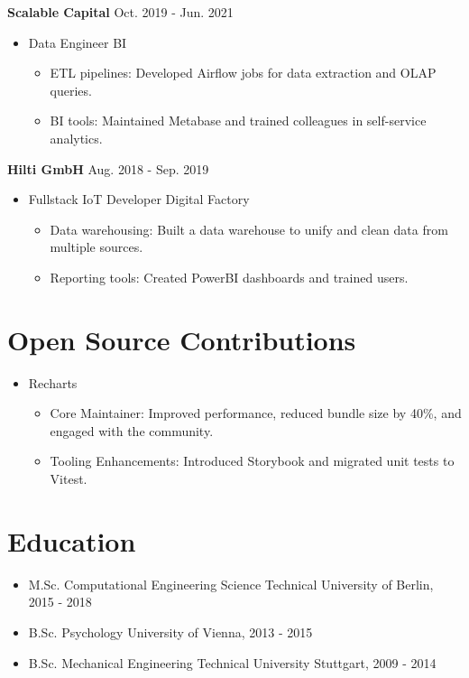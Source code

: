 \documentclass[letterpaper,11pt]{article}
\newcommand{\roleSpacing}{\vspace{4pt}}
\newcommand{\role}[2]{\item{#1 \hfill #2 \\}} %
\newcommand{\station}[2]{\textbf{#1}  \hfill #2 \\} %
\newcommand{\project}[2]{\item\small{#1: #2}} %
\newcommand{\resumeSubHeadingListStart}{\begin{itemize}[leftmargin=*]}
\newcommand{\resumeSubHeadingListEnd}{\end{itemize}}
\newcommand{\projectliststart}{\begin{itemize}[leftmargin=*] \vspace{-5pt} }
\newcommand{\projectlistend}{\end{itemize}\vspace{-5pt}}
\begin{document}
\roleSpacing

\station{Scalable Capital}{Oct. 2019 - Jun. 2021}
\resumeSubHeadingListStart
\role{Data Engineer}{BI}
\projectliststart
\project{ETL pipelines}{Developed Airflow jobs for data extraction and OLAP queries.}
\project{BI tools}{Maintained Metabase and trained colleagues in self-service analytics.}
\projectlistend
\resumeSubHeadingListEnd

\roleSpacing

\station{Hilti GmbH}{Aug. 2018 - Sep. 2019}
\resumeSubHeadingListStart
\role{Fullstack IoT Developer}{Digital Factory}
\projectliststart
\project{Data warehousing}{Built a data warehouse to unify and clean data from multiple sources.}
\project{Reporting tools}{Created PowerBI dashboards and trained users.}
\projectlistend
\resumeSubHeadingListEnd

\section{Open Source Contributions}

\resumeSubHeadingListStart
\role{Recharts}{}
\projectliststart
\project{Core Maintainer}{Improved performance, reduced bundle size by 40\%, and engaged with the community.}
\project{Tooling Enhancements}{Introduced Storybook and migrated unit tests to Vitest.}
\projectlistend
\resumeSubHeadingListEnd

\section{Education}
\resumeSubHeadingListStart
\role{M.Sc. Computational Engineering Science}{Technical University of Berlin, 2015 - 2018}
\role{B.Sc. Psychology}{University of Vienna, 2013 - 2015}
\role{B.Sc. Mechanical Engineering}{Technical University Stuttgart, 2009 - 2014}
\resumeSubHeadingListEnd
\end{document}
